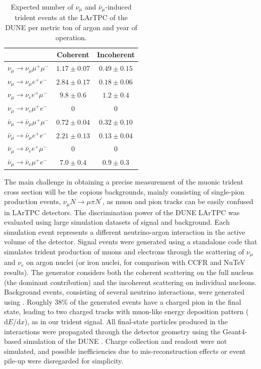 \begin{table}[!b]
\begin{center}
\begin{tabular}{lcc}
\toprule
& Coherent & Incoherent \\
\midrule
$\nu_\mu \to \nu_\mu \mu^+\mu^-$ & $1.17 \pm 0.07$ & $0.49 \pm 0.15$ \\
$\nu_\mu \to \nu_\mu e^+e^-$ & $2.84 \pm 0.17$ & $0.18 \pm 0.06$\\
$\nu_\mu \to \nu_e e^+\mu^-$ & $9.8 \pm 0.6$ & $1.2 \pm 0.4$ \\
$\nu_\mu \to \nu_e \mu^+e^-$ & $0$ & $0$ \\
\midrule
$\bar\nu_\mu \to \bar\nu_\mu \mu^+\mu^-$ & $0.72 \pm 0.04$ & $0.32 \pm 0.10$ \\
$\bar\nu_\mu \to \bar\nu_\mu e^+e^-$ & $2.21 \pm 0.13$ & $0.13 \pm 0.04$ \\
$\bar\nu_\mu \to \bar\nu_e e^+\mu^-$ & $0$ & $0$ \\
$\bar\nu_\mu \to \bar\nu_e \mu^+e^-$ & $7.0 \pm 0.4$ & $0.9 \pm 0.3$ \\
\bottomrule
\end{tabular}
\end{center}
\caption[Expected number of SM $\nu_\mu$ and $\bar\nu_\mu$-induced trident events at ND per t of Ar per year] %
{Expected number of  $\nu_\mu$ and $\bar\nu_\mu$-induced trident events at the LArTPC of the DUNE  per metric ton of argon and year of operation.}
\label{tab:trident_rates}
\end{table}


The main challenge in obtaining a precise measurement of the muonic trident cross section will be the copious backgrounds, mainly consisting of  single-pion production events, $\nu_\mu N \to \mu \pi N^\prime$, as muon and pion tracks can be easily confused in LArTPC detectors. The discrimination power of the DUNE  LArTPC was evaluated using large simulation datasets of signal and background. Each simulation event represents a different neutrino-argon interaction in the active volume of the detector. Signal events were generated using a standalone code \cite{Altmannshofer:2019zhy} that simulates trident production of muons and electrons through the scattering of $\nu_{\mu}$ and $\nu_e$ on argon nuclei (or iron nuclei, for comparison with CCFR and NuTeV results). The generator considers both the coherent scattering on the full nucleus (the dominant contribution) and the incoherent scattering on individual nucleons. Background events, consisting of several  neutrino interactions, were generated using . Roughly $38\%$ of the generated events have a charged pion in the final state, leading to two charged tracks with muon-like energy deposition pattern ($\mathrm{d}E/\mathrm{d}x$), as in our trident signal. All final-state particles produced in the interactions were propagated through the detector geometry using the Geant4-based \cite{Agostinelli:2002hh,Allison:2006ve,Allison:2016lfl} simulation of the DUNE . Charge collection and readout were not simulated, and possible inefficiencies due to mis-reconstruction effects or event pile-up were disregarded for simplicity.


